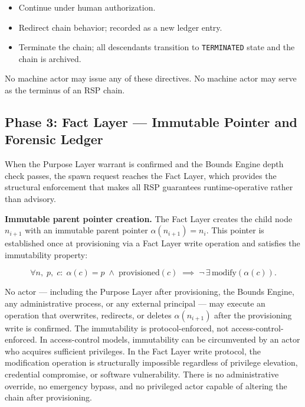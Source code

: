 \begin{itemize}
    \item[\texttt{ACK}] Continue under human authorization.
    \item[\texttt{RESOLVE}] Redirect chain behavior; recorded as a new ledger entry.
    \item[\texttt{REJECT}] Terminate the chain; all descendants transition to \texttt{TERMINATED} state and the chain is archived.
\end{itemize}

No machine actor may issue any of these directives. No machine actor may serve as the terminus of an RSP chain.

\subsection{Phase 3: Fact Layer — Immutable Pointer and Forensic Ledger}
\label{sec:rs-phase3}

When the Purpose Layer warrant is confirmed and the Bounds Engine depth check passes, the spawn request reaches the Fact Layer, which provides the structural enforcement that makes all RSP guarantees runtime-operative rather than advisory.

\medskip
\noindent\textbf{Immutable parent pointer creation.} The Fact Layer creates the child node $n_{i+1}$ with an immutable parent pointer $\alpha(n_{i+1}) = n_i$. This pointer is established once at provisioning via a Fact Layer write operation and satisfies the immutability property:

\begin{equation}
\forall n,\; p,\; c:\;
\alpha(c) = p \;\land\; \text{provisioned}(c)
\;\implies\;
\neg\,\exists\,\text{modify}(\alpha(c)).
\label{eq:parent-pointer-immutability}
\end{equation}

No actor — including the Purpose Layer after provisioning, the Bounds Engine, any administrative process, or any external principal — may execute an operation that overwrites, redirects, or deletes $\alpha(n_{i+1})$ after the provisioning write is confirmed. The immutability is protocol-enforced, not access-control-enforced. In access-control models, immutability can be circumvented by an actor who acquires sufficient privileges. In the Fact Layer write protocol, the modification operation is structurally impossible regardless of privilege elevation, credential compromise, or software vulnerability. There is no administrative override, no emergency bypass, and no privileged actor capable of altering the chain after provisioning.

